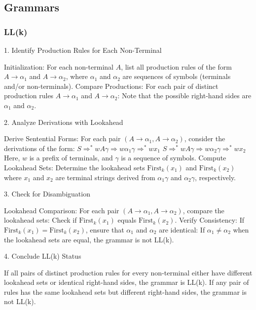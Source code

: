 \subsection{Grammars}

\subsubsection{LL(k)}
1. Identify Production Rules for Each Non-Terminal

    Initialization:
    For each non-terminal \( A \), list all production rules of the form \( A \rightarrow \alpha_1 \) and \( A \rightarrow \alpha_2 \), where \( \alpha_1 \) and \( \alpha_2 \) are sequences of symbols (terminals and/or non-terminals).
    Compare Productions:
    For each pair of distinct production rules \( A \rightarrow \alpha_1 \) and \( A \rightarrow \alpha_2 \):
        Note that the possible right-hand sides are \( \alpha_1 \) and \( \alpha_2 \).

2. Analyze Derivations with Lookahead

    Derive Sentential Forms:
    For each pair \( (A \rightarrow \alpha_1, A \rightarrow \alpha_2) \), consider the derivations of the form:
        \( S \Rightarrow^* w A \gamma \Rightarrow w \alpha_1 \gamma \Rightarrow^* w x_1 \)
        \( S \Rightarrow^* w A \gamma \Rightarrow w \alpha_2 \gamma \Rightarrow^* w x_2 \)
    Here, \( w \) is a prefix of terminals, and \( \gamma \) is a sequence of symbols.
    Compute Lookahead Sets:
    Determine the lookahead sets \( \text{First}_k(x_1) \) and \( \text{First}_k(x_2) \) where \( x_1 \) and \( x_2 \) are terminal strings derived from \( \alpha_1 \gamma \) and \( \alpha_2 \gamma \), respectively.

3. Check for Disambiguation

    Lookahead Comparison:
    For each pair \( (A \rightarrow \alpha_1, A \rightarrow \alpha_2) \), compare the lookahead sets:
        Check if \( \text{First}_k(x_1) \) equals \( \text{First}_k(x_2) \).
    Verify Consistency:
    If \( \text{First}_k(x_1) = \text{First}_k(x_2) \), ensure that \( \alpha_1 \) and \( \alpha_2 \) are identical:
        If \( \alpha_1 \neq \alpha_2 \) when the lookahead sets are equal, the grammar is not LL(k).

4. Conclude LL(k) Status

    If all pairs of distinct production rules for every non-terminal either have different lookahead sets or identical right-hand sides, the grammar is LL(k).
    If any pair of rules has the same lookahead sets but different right-hand sides, the grammar is not LL(k).



